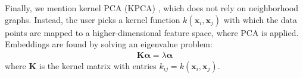 \documentclass{article} %
\begin{document}
Finally, we mention kernel PCA (KPCA) \citep{kpca}, which does not rely on neighborhood graphs. Instead, the user picks a kernel function $k(\bm{x}_i,\bm{x}_j)$ with which the data points are mapped to a higher-dimensional feature space, where PCA is applied. Embeddings are found by solving an eigenvalue problem:
\begin{align}
\bm{K} \bm{\alpha} = \lambda \bm{\alpha}
\end{align}
where $\bm{K}$ is the kernel matrix with entries $k_{ij} = k(\bm{x}_i, \bm{x}_j)$.


\begin{comment}
Isomap \citep{isomap} builds a distance matrix of approximated geodesics between all points, where geodesics are estimated as shortest-distance paths across the neighborhood graph. Then, it minimizes the above objective where $d(\bm{x}_i,\bm{x}_j)$ is the approximated geodesic distance between the $i$-th and $j$-th points.


Without a well-described mapping of relations between points, the task of capturing the alternating stiffness along a dataset becomes more difficult. Therefore, practically all methods for nonlinear dimensionality reduction use neighborhood graphs \citep{manifold-learning-whathowwhy}. And so, there are fundamental characteristics that can separate them further into different subtypes of methods.

Depending on the objective function, the same optimization problem can focus on different details. Moreover, multiple frequently applied methods derive from the general formulation of Multidimensional Scaling, as is Isomap.

\textbf{Isomap} \citep{isomap} extends multidimensional scaling (MDS) to nonlinear manifolds by approximating geodesic distances through shortest paths on the neighborhood graph. Given data points $\bm{X}=\{\bm{x}_i\}_{i=1}^N, \bm{x}_i\in\R^D$, Isomap constructs a neighborhood graph where each point is connected to its $k$-nearest neighbors. The shortest path distance through the neighborhood approximates the geodesic distance between any two points. The embedding $\bm{Y} =\{\bm{y}_i\}_{i=1}^N, \bm{y}_i\in\R^d$ is then found by applying classical MDS to preserve these geodesic distances, solving:
\begin{align}
\min_{\bm{y}_1,\ldots,\bm{y}_{N}} \sum_{i=1}^{N}\sum_{j=1}^{N} (d(\bm{x}_i, \bm{x}_j) - \|\bm{y}_i - \bm{y}_j\|_2)^2
\end{align}
where $d(\bm{x}_i, \bm{x}_j)$ denotes the shortest path distance in the neighborhood graph.


\end{comment}
\end{document}
